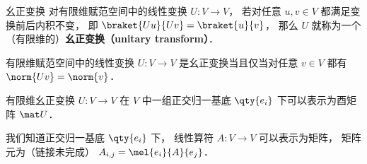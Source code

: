 
\begin{issues}
\issueDraft
\end{issues}


\begin{definition}{幺正变换}
对有限维赋范空间中的线性变换 $U: V\to V$， 若对任意 $u, v \in V$ 都满足变换前后内积不变， 即 $\braket{Uu}{Uv} = \braket{u}{v}$， 那么 $U$ 就称为一个（有限维的）\textbf{幺正变换（unitary transform）}．
\end{definition}

\begin{theorem}{}
有限维赋范空间中的线性变换 $U: V\to V$ 是幺正变换当且仅当对任意 $v\in V$ 都有 $\norm{Uv} = \norm{v}$．
\end{theorem}

\begin{theorem}{}
有限维幺正变换 $U: V\to V$ 在 $V$ 中一组正交归一基底 $\qty{e_i}$ 下可以表示为酉矩阵 $\mat U$．
\end{theorem}
我们知道正交归一基底 $\qty{e_i}$ 下， 线性算符 $A:V\to V$ 可以表示为矩阵， 矩阵元为（链接未完成） $A_{i,j} = \mel{e_i}{A}{e_j}$．
